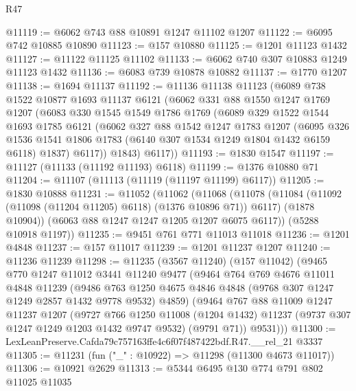 \begin{lexlean}{R47}
\begin{coremodule}
@11119 := @6062 @743 @88 @10891 @1247 @11102 @1207
@11122 := @6095 @742 @10885 @10890
@11123 := @157 @10880
@11125 := @1201 @11123 @1432
@11127 := @11122 @11125 @11102
@11133 := @6062 @740 @307 @10883 @1249 @11123 @1432
@11136 := @6083 @739 @10878 @10882
@11137 := @1770 @1207
@11138 := @1694 @11137
@11192 := @11136
    @11138
    @11123
    (@6089
      @738
      @1522
      @10877
      @1693
      @11137
      @6121
      (@6062
        @331
        @88
        @1550
        @1247
        @1769
        @1207
        (@6083
          @330
          @1545
          @1549
          @1786
          @1769
          (@6089
            @329
            @1522
            @1544
            @1693
            @1785
            @6121
            (@6062
              @327
              @88
              @1542
              @1247
              @1783
              @1207
              (@6095
                @326
                @1536
                @1541
                @1806
                @1783
                (@6140 @307 @1534 @1249 @1804 @1432 @6159 @6118)
                @1837)
              @6117))
          @1843)
        @6117))
@11193 := @1830 @1547
@11197 := @11127 (@11133 (@11192 @11193) @6118)
@11199 := @1376 @10880 @71
@11204 := @11107 (@11113 (@11119 (@11197 @11199) @6117))
@11205 := @1830 @10888
@11231 := @11052
    (@11062
      (@11068
        (@11078
          (@11084 (@11092 (@11098 (@11204 @11205) @6118) (@1376 @10896 @71)) @6117)
          (@1878 @10904))
        (@6063 @88 @1247 @1247 @1205 @1207 @6075 @6117))
      (@5288 @10918 @1197))
@11235 := @9451 @761 @771 @11013 @11018
@11236 := @1201 @4848
@11237 := @157 @11017
@11239 := @1201 @11237 @1207
@11240 := @11236 @11239
@11298 := @11235
    (@3567 @11240)
    (@157 @11042)
    (@9465
      @770
      @1247
      @11012
      @3441
      @11240
      @9477
      (@9464
        @764
        @769
        @4676
        @11011
        @4848
        @11239
        (@9486 @763 @1250 @4675 @4846 @4848 (@9768 @307 @1247 @1249 @2857 @1432 @9778 @9532) @4859)
        (@9464
          @767
          @88
          @11009
          @1247
          @11237
          @1207
          (@9727
            @766
            @1250
            @11008
            (@1204 @1432)
            @11237
            (@9737 @307 @1247 @1249 @1203 @1432 @9747 @9532)
            (@9791 @71))
          @9531)))
@11300 := LexLeanPreserve.Cafda79c757163ffe4c6f07f487422bdf.R47.__rel_21 @3337
@11305 := @11231 (fun ("_" : @10922) => @11298 (@11300 @4673 @11017))
@11306 := @10921 @2629
@11313 := @5344 @6495 @130 @774 @791 @802 @11025 @11035

\end{coremodule}
\end{lexlean}
